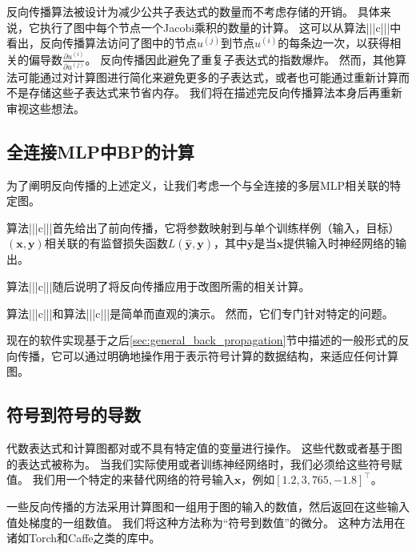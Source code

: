 
反向传播算法被设计为减少公共子表达式的数量而不考虑存储的开销。
具体来说，它执行了图中每个节点一个Jacobi乘积的数量的计算。
这可以从算法|||c|||中看出，反向传播算法访问了图中的节点$u^{(j)}$到节点$u^{(i)}$的每条边一次，以获得相关的偏导数$\frac{\partial u^{(i)}}{\partial u^{(j)}}$。
反向传播因此避免了重复子表达式的指数爆炸。
然而，其他算法可能通过对计算图进行简化来避免更多的子表达式，或者也可能通过重新计算而不是存储这些子表达式来节省内存。
我们将在描述完反向传播算法本身后再重新审视这些想法。


\subsection{全连接MLP中BP的计算}
\label{sec:back_propagation_computation_in_fully_connected_mlp}

为了阐明反向传播的上述定义，让我们考虑一个与全连接的多层MLP相关联的特定图。

算法|||c|||首先给出了前向传播，它将参数映射到与单个训练样例（输入，目标）$(\bm{x},\bm{y})$相关联的有监督损失函数$L(\hat{\bm{y}}, \bm{y})$，其中$\hat{\bm{y}}$是当$\bm{x}$提供输入时神经网络的输出。

算法|||c|||随后说明了将反向传播应用于改图所需的相关计算。

算法|||c|||和算法|||c|||是简单而直观的演示。
然而，它们专门针对特定的问题。

现在的软件实现基于之后\ref{sec:general_back_propagation}节中描述的一般形式的反向传播，它可以通过明确地操作用于表示符号计算的数据结构，来适应任何计算图。


\subsection{符号到符号的导数}
\label{sec:symbol_to_symbol_derivatives}

代数表达式和计算图都对或不具有特定值的变量进行操作。
这些代数或者基于图的表达式被称为。
当我们实际使用或者训练神经网络时，我们必须给这些符号赋值。
我们用一个特定的来替代网络的符号输入$\bm{x}$，例如$[1.2, 3,765, -1.8]^\top$。

一些反向传播的方法采用计算图和一组用于图的输入的数值，然后返回在这些输入值处梯度的一组数值。
我们将这种方法称为``符号到数值''的微分。
这种方法用在诸如Torch\citep{Torch-2011}和Caffe\citep{Jia13caffe}之类的库中。

